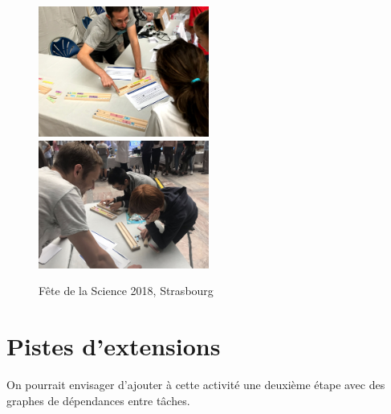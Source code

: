 \documentclass[a4paper]{article}
\begin{document}
\begin{figure}[h!]
\includegraphics[width=0.5\textwidth]{photo_activite.jpg}
\includegraphics[width=0.5\textwidth]{photo_activite2.jpg}

\caption{Fête de la Science 2018, Strasbourg}
\end{figure}

\section{Pistes d'extensions}

On pourrait envisager d'ajouter à cette activité une deuxième étape avec des graphes de dépendances entre tâches.







\clearpage

 

\end{document}
